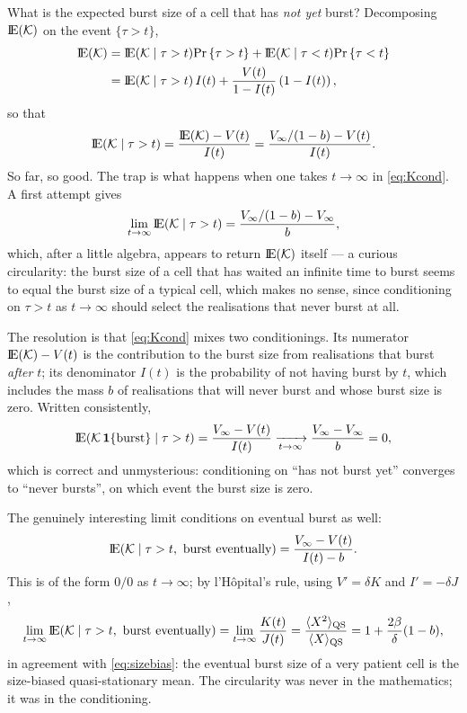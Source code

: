 What is the expected burst size of a cell that has \emph{not yet} burst?
Decomposing ${\rm I}\!{\rm E}(\mathcal{K})$ on the event $\{\tau>t\}$,
\begin{align}
{\rm I}\!{\rm E}(\mathcal{K}) &= {\rm I}\!{\rm E}(\mathcal{K}\mid \tau > t) {\text{Pr}\left\{\tau > t\right\}} + {\rm I}\!{\rm E}(\mathcal{K}\mid \tau < t){\text{Pr}\left\{\tau<t\right\}}\nonumber\\
&= {\rm I}\!{\rm E}(\mathcal{K}\mid\tau > t)\, I(t) + \frac{V(t)}{1 - I(t)} \left(1 - I(t)\right),
\end{align}
so that
\begin{equation}
{\rm I}\!{\rm E}(\mathcal{K}\mid \tau > t)  = \frac{{\rm I}\!{\rm E}(\mathcal{K}) - V(t)}{I(t)}
=\frac{V_\infty/(1-b) - V(t)}{I(t)}.
\label{eq:Kcond}
\end{equation}
So far, so good. The trap is what happens when one takes $t\to\infty$ in
\eqref{eq:Kcond}. A first attempt gives
$$
\lim_{t\to\infty}{\rm I}\!{\rm E}(\mathcal{K}\mid \tau > t)
=\frac{V_\infty/(1-b)-V_\infty}{b},
$$
which, after a little algebra, appears to return ${\rm I}\!{\rm E}(\mathcal{K})$ itself --- a
curious circularity: the burst size of a cell that has waited an infinite
time to burst seems to equal the burst size of a typical cell, which makes
no sense, since conditioning on $\tau>t$ as $t\to\infty$ should select the
realisations that never burst at all.

The resolution is that \eqref{eq:Kcond} mixes two conditionings. Its
numerator ${\rm I}\!{\rm E}(\mathcal{K})-V(t)$ is the contribution to the burst size from
realisations that burst \emph{after} $t$; its denominator $I(t)$ is the
probability of not having burst by $t$, which includes the mass $b$ of
realisations that will never burst and whose burst size is zero. Written
consistently,
\begin{equation}
{\rm I}\!{\rm E}(\mathcal{K}\,\mathbf 1\{\text{burst}\}\mid\tau>t)
=\frac{V_\infty-V(t)}{I(t)}
\xrightarrow[t\to\infty]{}\frac{V_\infty-V_\infty}{b}=0,
\end{equation}
which is correct and unmysterious: conditioning on ``has not burst yet''
converges to ``never bursts'', on which event the burst size is zero.

The genuinely interesting limit conditions on eventual burst as well:
\begin{equation}
{\rm I}\!{\rm E}(\mathcal{K}\mid \tau>t,\ \text{burst eventually})
=\frac{V_\infty-V(t)}{I(t)-b}.
\end{equation}
This is of the form $0/0$ as $t\to\infty$; by l'H\^opital's rule, using
$V'=\delta K$ and $I'=-\delta J$,
\begin{equation}
\lim_{t\to\infty}\mean{\Kb\mid \tau>t,\ \text{burst eventually}}
=\lim_{t\to\infty}\frac{K(t)}{J(t)}
=\frac{\langle X^2\rangle_{\rm QS}}{\langle X\rangle_{\rm QS}}
=1+\frac{2\beta}{\delta}(1-b),
\label{eq:latemean}
\end{equation}
in agreement with \eqref{eq:sizebias}: the eventual burst size of a very
patient cell is the size-biased quasi-stationary mean. The circularity was
never in the mathematics; it was in the conditioning.
